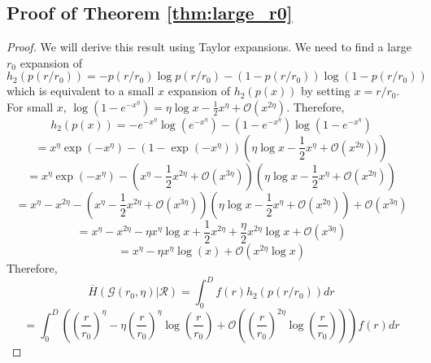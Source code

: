 \documentclass{article}
\newcommand{\graph}{\mathcal{G}}
\newcommand{\bigO}[1]{\mathcal{O}\left(#1\right)}
\begin{document}
\subsection{Proof of Theorem \ref{thm:large_r0}}
\label{sec:large_r0}
\begin{proof}
    We will derive this result using Taylor expansions. We need to find a large $r_0$ expansion of \begin{equation}
        h_2(p(r/r_0)) = -p(r/r_0)\log p(r/r_0) - (1-p(r/r_0))\log (1-p(r/r_0))
    \end{equation}
    which is equivalent to a small $x$ expansion of $h_2(p(x))$ by setting $x=r/r_0$. For small $x$, $\log(1-e^{-x^\eta}) = \eta\log x - \frac{1}{2}x^\eta + \bigO{x^{2\eta}}$. Therefore,
    \begin{equation}
        h_2(p(x)) = -e^{-x^{\eta}}\log(e^{-x^{\eta}}) - (1-e^{-x^{\eta}})\log(1-e^{-x^{\eta}})
    \end{equation}
    \begin{equation}
        = x^{\eta}\exp(-x^\eta)-(1-\exp(-x^\eta))\left(\eta\log x - \frac{1}{2}x^\eta + \bigO{x^{2\eta}})\right)
    \end{equation}
    \begin{equation}
        = x^{\eta}\exp(-x^\eta) - \left(x^\eta -\frac{1}{2}x^{2\eta}+\bigO{x^{3\eta}}\right)\left(\eta\log x - \frac{1}{2}x^\eta + \bigO{x^{2\eta}}\right)
    \end{equation}
    \begin{equation}
        = x^\eta-x^{2\eta} - \left(x^\eta -\frac{1}{2}x^{2\eta}+\bigO{x^{3\eta}}\right)\left(\eta\log x - \frac{1}{2}x^\eta + \bigO{x^{2\eta}}\right) + \bigO{x^{3\eta}}
    \end{equation}
    \begin{equation}
        = x^\eta-x^{2\eta} -\eta x^\eta \log x + \frac{1}{2}x^{2\eta} + \frac{\eta}{2} x^{2\eta} \log x + \bigO{x^{3\eta}}
    \end{equation}
    \begin{equation}
        = x^{\eta} - \eta x^\eta \log(x) + \bigO{x^{2\eta}\log x}
    \end{equation}
    Therefore,
    \begin{equation}
        \overline{H}(\graph(r_0,\eta)|\mathcal{R})  = \int_0^D f(r)h_2(p(r/r_0))dr
    \end{equation}
    \begin{equation}
        = \int_0^D \left(\left(\frac{r}{r_0}\right)^\eta - \eta \left(\frac{r}{r_0}\right)^{\eta}\log \left(\frac{r}{r_0}\right) + \bigO{\left(\frac{r}{r_0}\right)^{2\eta}\log \left(\frac{r}{r_0}\right)} \right)f(r)dr

\end{equation}
\end{proof}
\end{document}
